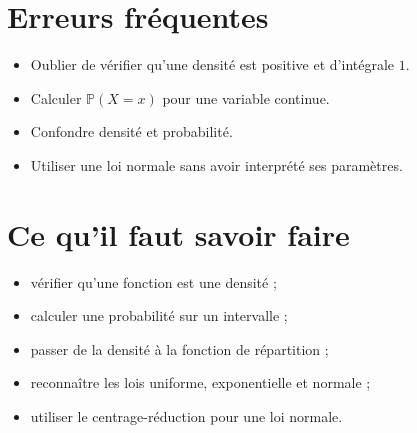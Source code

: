 \section{Erreurs fréquentes}

\begin{itemize}
    \item Oublier de vérifier qu'une densité est positive et d'intégrale $1$.
    \item Calculer $\mathbb{P}(X=x)$ pour une variable continue.
    \item Confondre densité et probabilité.
    \item Utiliser une loi normale sans avoir interprété ses paramètres.
\end{itemize}

\section{Ce qu'il faut savoir faire}

\begin{itemize}
    \item vérifier qu'une fonction est une densité ;
    \item calculer une probabilité sur un intervalle ;
    \item passer de la densité à la fonction de répartition ;
    \item reconnaître les lois uniforme, exponentielle et normale ;
    \item utiliser le centrage-réduction pour une loi normale.
\end{itemize}

